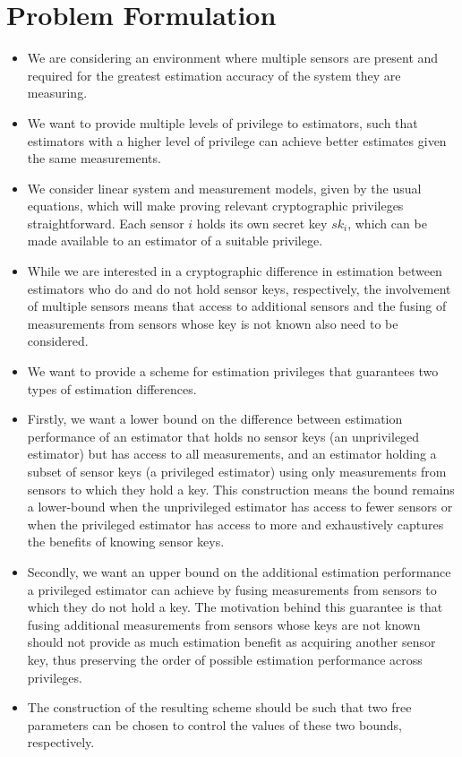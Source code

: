 \documentclass[conference]{IEEEtran}
\begin{document}
\section{Problem Formulation}
\begin{itemize}
  \item We are considering an environment where multiple sensors are present and required for the greatest estimation accuracy of the system they are measuring.
  \item We want to provide multiple levels of privilege to estimators, such that estimators with a higher level of privilege can achieve better estimates given the same measurements.
  \item We consider linear system and measurement models, given by the usual equations, which will make proving relevant cryptographic privileges straightforward. Each sensor $i$ holds its own secret key $sk_i$, which can be made available to an estimator of a suitable privilege.
  \item While we are interested in a cryptographic difference in estimation between estimators who do and do not hold sensor keys, respectively, the involvement of multiple sensors means that access to additional sensors and the fusing of measurements from sensors whose key is not known also need to be considered.
  \item We want to provide a scheme for estimation privileges that guarantees two types of estimation differences.
  \item Firstly, we want a lower bound on the difference between estimation performance of an estimator that holds no sensor keys (an unprivileged estimator) but has access to all measurements, and an estimator holding a subset of sensor keys (a privileged estimator) using only measurements from sensors to which they hold a key. This construction means the bound remains a lower-bound when the unprivileged estimator has access to fewer sensors or when the privileged estimator has access to more and exhaustively captures the benefits of knowing sensor keys.
  \item Secondly, we want an upper bound on the additional estimation performance a privileged estimator can achieve by fusing measurements from sensors to which they do not hold a key. The motivation behind this guarantee is that fusing additional measurements from sensors whose keys are not known should not provide as much estimation benefit as acquiring another sensor key, thus preserving the order of possible estimation performance across privileges.
  \item The construction of the resulting scheme should be such that two free parameters can be chosen to control the values of these two bounds, respectively.
\end{itemize}
\end{document}
